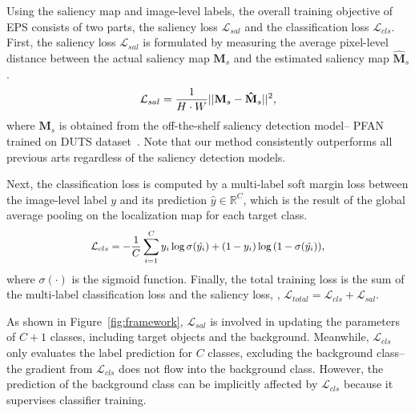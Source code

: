 \documentclass[final]{cvpr}
\begin{document}
Using the saliency map and image-level labels, the overall training objective of EPS consists of two parts, the saliency loss $\mathcal{L}_{sal}$ and the classification loss $\mathcal{L}_{cls}$. First, the saliency loss $\mathcal{L}_{sal}$ is formulated by measuring the average pixel-level distance between the actual saliency map $\mathbf{M}_{s}$ and the estimated saliency map $\mathbf{\hat{M}}_{s}$.
\vspace{-1mm}
\begin{equation}
{\small
\label{loss_sal}
\mathcal{L}_{sal} = \frac{1}{H\cdot W}||\mathbf{M}_{s}-\mathbf{\hat{M}}_{s}||^{2},
}
\vspace{-1mm}
\end{equation}
\noindent where $\mathbf{M}_{s}$ is obtained from the off-the-shelf saliency detection model-- PFAN~\cite{zhao2019pyramid} trained on DUTS dataset~\cite{wang2017learning}. Note that our method consistently outperforms all previous arts regardless of the saliency detection models.


Next, the classification loss is computed by a multi-label soft margin loss between the image-level label $y$ and its prediction $\hat{y} \in \mathbb{R}^C$, which is the result of the global average pooling on the localization map for each target class.
\vspace{-1mm}
\begin{equation}
{\small
\begin{split}
\label{loss_cls}
\mathcal{L}_{cls}= - \frac{1}{C} \sum_{i=1}^{C} y_i \log{\sigma(\hat{y_i})} + (1-y_i) \log{(1 - \sigma(\hat{y_i}))},
\end{split}}\vspace{-1mm}
\end{equation}
\noindent where $\sigma(\cdot)$ is the sigmoid function. Finally, the total training loss is the sum of the multi-label classification loss and the saliency loss, \ie, $\mathcal{L}_{total} = \mathcal{L}_{cls} + \mathcal{L}_{sal}$. 


As shown in Figure~\ref{fig:framework}, $\mathcal{L}_{sal}$ is involved in updating the parameters of $C+1$ classes, including target objects and the background. Meanwhile, $\mathcal{L}_{cls}$ only evaluates the label prediction for $C$ classes, excluding the background class-- the gradient from $\mathcal{L}_{cls}$ does not flow into the background class. However, the prediction of the background class can be implicitly affected by $\mathcal{L}_{cls}$ because it supervises classifier training.
\end{document}
